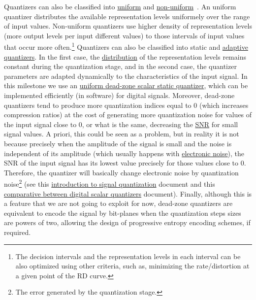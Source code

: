 Quantizers can also be classified into
\href{https://en.wikipedia.org/wiki/Quantization_(signal_processing)#Mid-riser_and_mid-tread_uniform_quantizers}{uniform}
and
\href{https://nptel.ac.in/content/storage2/courses/117104069/chapter_5/5_5.html}{non-uniform}~\cite{sayood2017introduction,vetterli2014foundations}. An
uniform quantizer distributes the available representation levels
uniformely over the range of input values. Non-uniform quantizers use
higher density of representation levels (more output levels per input
different values) to those intervals of input values that occur more
often.\footnote{The decision intervals and the representation levels
  in each interval can be also optimized using other criteria, such
  as, minimizing the rate/distortion at a given point of the RD
  curve.} Quantizers can also be classified into static
and
\href{https://en.wikipedia.org/wiki/Adaptive_differential_pulse-code_modulation}{adaptive
  quantizers}. In the first case, the
\href{https://en.wikipedia.org/wiki/Probability_distribution}{distribution}
of the representation levels remains constant during the quantization
stage, and in the second case, the quantizer parameters are adapted
dynamically to the characteristics of the input signal. In this
milestone we use an
\href{https://en.wikipedia.org/wiki/Quantization_(signal_processing)#Dead-zone_quantizers}{uniform
  dead-zone scalar static quantizer}, which can be implemented
efficiently (in software) for digital signals. Moreover, dead-zone
quantizers tend to produce more quantization indices equal to 0 (which
increases compression ratios) at the cost of generating more
quantization noise for values of the input signal close to 0, or what
is the same, decreasing the
\href{https://en.wikipedia.org/wiki/Signal-to-noise_ratio}{SNR} for
small signal values. A priori, this could be seen as a problem, but in
reality it is not because precisely when the amplitude of the signal
is small and the noise is independent of its amplitude (which usually
happens with
\href{https://en.wikipedia.org/wiki/Noise_(electronics)}{electronic
  noise}), the SNR of the input signal has its lowest value precisely
for those values close to 0. Therefore, the quantizer will basically
change electronic noise by quantization noise\footnote{The error
  generated by the quantization stage.} (see this
\href{https://github.com/vicente-gonzalez-ruiz/signal_quantization}{introduction
  to signal quantization} document and this
\href{https://github.com/vicente-gonzalez-ruiz/scalar_quantization}{comparative
  between digital scalar quantizers} document). Finally, although this
is a feature that we are not going to exploit for now, dead-zone
quantizers are equivalent to encode the signal by bit-planes when the
quantization steps sizes are powers of two, allowing the design of
progressive entropy encoding schemes, if required.

